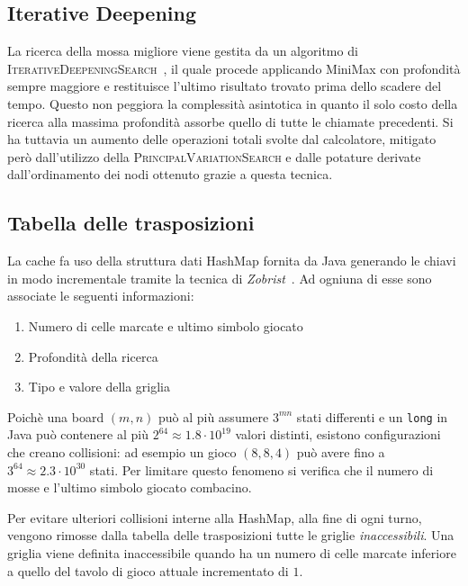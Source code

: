 \documentclass{article}
\begin{document}
\subsection*{Iterative Deepening}

La ricerca della mossa migliore viene gestita da un algoritmo di
\textsc{IterativeDeepeningSearch}~\cite{id}, il quale procede applicando MiniMax %
con profondit\`a sempre maggiore e restituisce l'ultimo risultato trovato prima dello
scadere del tempo. Questo non peggiora la complessit\`a asintotica in quanto il
solo costo della ricerca alla massima profondit\`a assorbe quello di tutte
le chiamate precedenti. Si ha tuttavia un aumento delle operazioni totali svolte
dal calcolatore, mitigato per\`o dall'utilizzo della \textsc{PrincipalVariationSearch} 
e dalle potature derivate dall'ordinamento dei nodi ottenuto grazie a questa tecnica.

\subsection*{Tabella delle trasposizioni}

La cache fa uso della struttura dati HashMap fornita da Java generando le chiavi 
in modo incrementale tramite la tecnica di \emph{Zobrist}~\cite{zobrist}. 
Ad ogniuna di esse sono associate le seguenti informazioni:
\begin{enumerate}
  \item Numero di celle marcate e ultimo simbolo giocato
  \item Profondit\`a della ricerca
  \item Tipo e valore della griglia
\end{enumerate}
Poich\`e una board $(m,n)$ pu\`o al pi\`u assumere $3^{mn}$ stati differenti e
un \verb!long! in Java pu\`o contenere al pi\`u $2^{64} \approx 1.8 \cdot 10^{19}$ valori distinti,
esistono configurazioni che creano collisioni: ad esempio un gioco $(8, 8, 4)$
pu\`o avere fino a $3^{64} \approx 2.3 \cdot 10^{30}$ stati. Per limitare questo
fenomeno si verifica che il numero di mosse e l'ultimo simbolo giocato combacino. %

Per evitare ulteriori collisioni interne alla HashMap, alla fine di
ogni turno, vengono rimosse dalla tabella delle trasposizioni tutte le griglie \emph{
inaccessibili}. Una griglia viene definita inaccessibile quando ha un numero di
celle marcate inferiore a quello del tavolo di gioco attuale incrementato di $1$.
\end{document}
